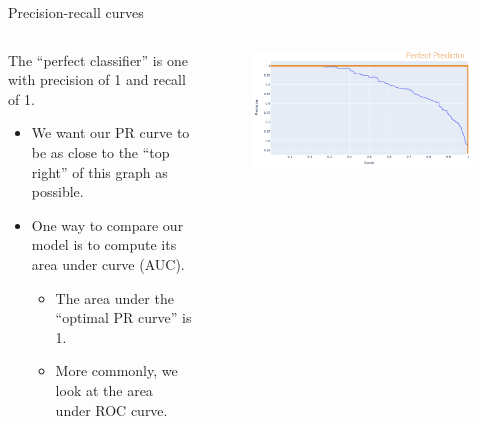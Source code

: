 \documentclass[aspectratio=169]{../latex_main/tntbeamer}  %
\begin{document}
	
	\begin{frame}{Precision-recall curves}
	    \begin{columns}
	        \begin{column}{.5\textwidth}
	        The “perfect classifier” is one with precision of 1 and recall of 1.
	             \begin{itemize}
	                 \item We want our PR curve to be as close to the “top right” of this graph as possible.
	                 \item One way to compare our model is to compute its area under curve (AUC).
	                 \begin{itemize}
	                     \item The area under the “optimal PR curve” is 1.
	                     \item More commonly, we look at the area under ROC curve.
	                 \end{itemize}
	             \end{itemize} 
	        \end{column}
	        
	        
	        \begin{column}{.5\textwidth}
	                \begin{figure}
	                    \centering
	                    \includegraphics[scale=.35]{Bild25}
	                \end{figure}
	                
	                
	        \end{column}
	        
	    \end{columns}
	\end{frame}
	
\end{document}

